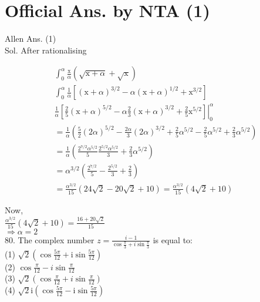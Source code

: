 \documentclass[10pt]{article}
\begin{document}
\section*{Official Ans. by NTA (1)}
Allen Ans. (1)\\
Sol. After rationalising

\[
\begin{aligned}
& \int_{0}^{\alpha} \frac{\mathrm{x}}{\alpha}(\sqrt{\mathrm{x}+\alpha}+\sqrt{\mathrm{x}}) \\
& \int_{0}^{\alpha} \frac{1}{\alpha}\left[(\mathrm{x}+\alpha)^{3 / 2}-\alpha(\mathrm{x}+\alpha)^{1 / 2}+\mathrm{x}^{3 / 2}\right] \\
&\left.\frac{1}{\alpha}\left[\frac{2}{5}(\mathrm{x}+\alpha)^{5 / 2}-\alpha \frac{2}{3}(\mathrm{x}+\alpha)^{3 / 2}+\frac{2}{5} \mathrm{x}^{5 / 2}\right]\right|_{0} ^{\alpha} \\
&= \frac{1}{\alpha}\left(\frac{5}{2}(2 \alpha)^{5 / 2}-\frac{2 \alpha}{3}(2 \alpha)^{3 / 2}+\frac{2}{5} \alpha^{5 / 2}-\frac{2}{5} \alpha^{5 / 2}+\frac{2}{3} \alpha^{5 / 2}\right) \\
&= \frac{1}{\alpha}\left(\frac{2^{7 / 2} \alpha^{5 / 2}}{5} \frac{2^{5 / 2} \alpha^{5 / 2}}{3}+\frac{2}{3} \alpha^{5 / 2}\right) \\
&= \alpha^{3 / 2}\left(\frac{2^{7 / 2}}{5}-\frac{2^{5 / 2}}{3}+\frac{2}{3}\right) \\
&= \frac{\alpha^{3 / 2}}{15}(24 \sqrt{2}-20 \sqrt{2}+10)=\frac{\alpha^{3 / 2}}{15}(4 \sqrt{2}+10)
\end{aligned}
\]

Now,\\
\(\frac{\alpha^{3 / 2}}{15}(4 \sqrt{2}+10)=\frac{16+20 \sqrt{2}}{15}\)\\
\(\Rightarrow \alpha=2\)\\
80. The complex number \(z=\frac{i-1}{\cos \frac{\pi}{3}+i \sin \frac{\pi}{3}}\) is equal to:\\
(1) \(\sqrt{2}\left(\cos \frac{5 \pi}{12}+\mathrm{i} \sin \frac{5 \pi}{12}\right)\)\\
(2) \(\cos \frac{\pi}{12}-i \sin \frac{\pi}{12}\)\\
(3) \(\sqrt{2}\left(\cos \frac{\pi}{12}+i \sin \frac{\pi}{12}\right)\)\\
(4) \(\sqrt{2} \mathrm{i}\left(\cos \frac{5 \pi}{12}-\mathrm{i} \sin \frac{5 \pi}{12}\right)\)
\end{document}
